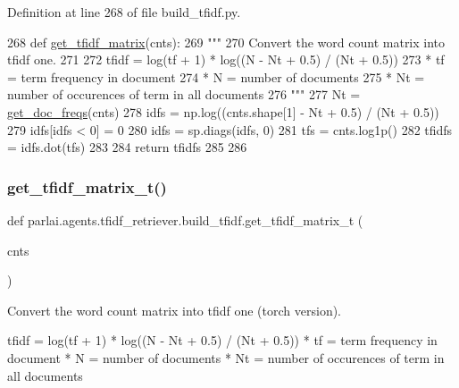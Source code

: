 Definition at line 268 of file build\+\_\+tfidf.\+py.


\begin{DoxyCode}
268 \textcolor{keyword}{def }\hyperlink{namespaceparlai_1_1agents_1_1tfidf__retriever_1_1build__tfidf_acce651a5b40c5a3b4009181f22c69eaa}{get\_tfidf\_matrix}(cnts):
269     \textcolor{stringliteral}{"""}
270 \textcolor{stringliteral}{    Convert the word count matrix into tfidf one.}
271 \textcolor{stringliteral}{}
272 \textcolor{stringliteral}{    tfidf = log(tf + 1) * log((N - Nt + 0.5) / (Nt + 0.5))}
273 \textcolor{stringliteral}{    * tf = term frequency in document}
274 \textcolor{stringliteral}{    * N = number of documents}
275 \textcolor{stringliteral}{    * Nt = number of occurences of term in all documents}
276 \textcolor{stringliteral}{    """}
277     Nt = \hyperlink{namespaceparlai_1_1agents_1_1tfidf__retriever_1_1build__tfidf_ac6883ed21006848661f6c748f91aff56}{get\_doc\_freqs}(cnts)
278     idfs = np.log((cnts.shape[1] - Nt + 0.5) / (Nt + 0.5))
279     idfs[idfs < 0] = 0
280     idfs = sp.diags(idfs, 0)
281     tfs = cnts.log1p()
282     tfidfs = idfs.dot(tfs)
283 
284     \textcolor{keywordflow}{return} tfidfs
285 
286 
\end{DoxyCode}
\mbox{\label{namespaceparlai_1_1agents_1_1tfidf__retriever_1_1build__tfidf_a3cd67edc9bfd76a8eeb49add2de75019}} 
\subsubsection{\texorpdfstring{get\+\_\+tfidf\+\_\+matrix\+\_\+t()}{get\_tfidf\_matrix\_t()}}
{\footnotesize\ttfamily def parlai.\+agents.\+tfidf\+\_\+retriever.\+build\+\_\+tfidf.\+get\+\_\+tfidf\+\_\+matrix\+\_\+t (\begin{DoxyParamCaption}\item[{}]{cnts }\end{DoxyParamCaption})}

\begin{DoxyVerb}Convert the word count matrix into tfidf one (torch version).

tfidf = log(tf + 1) * log((N - Nt + 0.5) / (Nt + 0.5))
* tf = term frequency in document
* N = number of documents
* Nt = number of occurences of term in all documents
\end{DoxyVerb}
 


